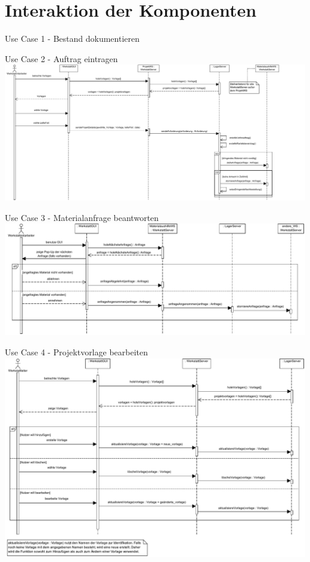\documentclass{beamer}
\begin{document}
	\section{Interaktion der Komponenten}
	\begin{frame}{Use Case 1 - Bestand dokumentieren}
	
\end{frame}
	\begin{frame}{Use Case 2 - Auftrag eintragen}
		\includegraphics[width=\textwidth]{PDF/Use_Case_2-Auftrag_eintragen.pdf}
	\end{frame}
	\begin{frame}{Use Case 3 - Materialanfrage beantworten}
		\includegraphics[width=\textwidth]{PDF/Use_Case_3-Materialanfrage_beantworten.pdf}
	\end{frame}
	\begin{frame}{Use Case 4 - Projektvorlage bearbeiten}
		\includegraphics[height=0.75 \textheight]{PDF/Use_Case_4-Projektvorlage_bearbeiten.pdf}
	\end{frame}
\end{document}
